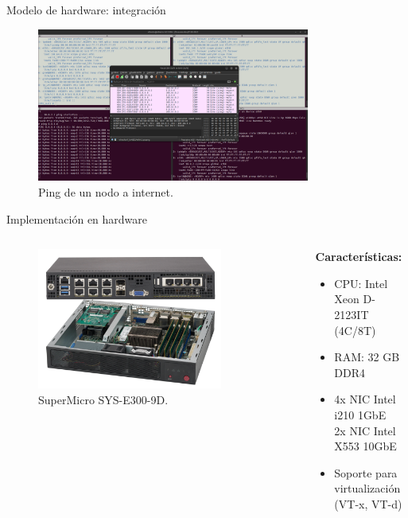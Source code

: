\documentclass[serif, aspectratio=169]{beamer}
\begin{document}
\begin{frame}{Modelo de hardware: integración}
\begin{figure}
    \centering
    \includegraphics[width=0.8\textwidth]{images/pinginternet.png}
    \caption{Ping de un nodo a internet.}
\end{figure}
\end{frame}

\begin{frame}{Implementación en hardware}
\begin{columns}
    \begin{column}{0.5\textwidth}
        \begin{figure}
            \centering
            \includegraphics[width=0.8\textwidth]{../../Tesis/figs/4_hardware.png}
            \caption{SuperMicro SYS-E300-9D.} 
        \end{figure}
    \end{column}
    \begin{column}{0.4\textwidth}
        \textbf{Características:}
        \begin{itemize}
            \item CPU: Intel Xeon D-2123IT (4C/8T)
            \item RAM: 32 GB DDR4
            \item 4x NIC Intel i210 1GbE \\
            2x NIC Intel X553 10GbE
            \item Soporte para virtualización (VT-x, VT-d)
        \end{itemize}
    \end{column}
\end{columns}
\end{frame}
\end{document}
